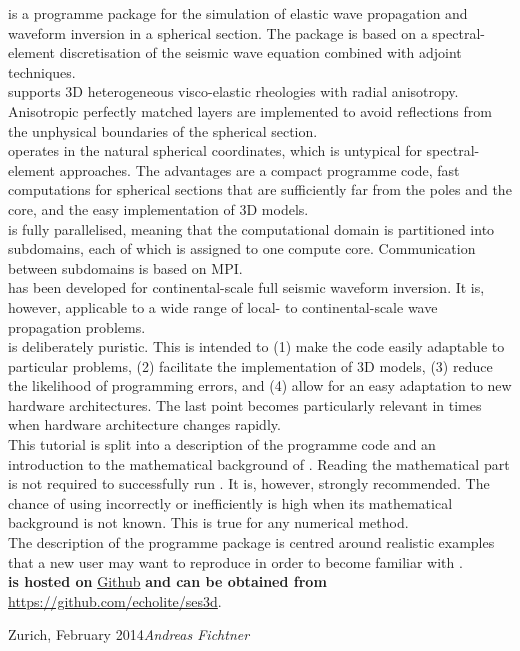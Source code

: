 \foreword

\SES is a programme package for the simulation of elastic wave
propagation and waveform inversion in a spherical section. The package is based on a spectral-element discretisation of
the seismic wave equation combined with adjoint techniques.\\[5pt]
\SES supports 3D heterogeneous visco-elastic rheologies with radial anisotropy. Anisotropic perfectly matched layers
are implemented to avoid reflections from the unphysical boundaries of the spherical section.\\[5pt]
\SES operates in the natural spherical coordinates, which is untypical for spectral-element approaches. The advantages are a
compact programme code, fast computations for spherical sections that are sufficiently far
from the poles and the core, and the easy implementation of 3D models.\\[5pt]
\SES is fully parallelised, meaning that the computational domain is partitioned into subdomains, each of which is assigned to one compute core. Communication between subdomains is based on MPI.\\[5pt]
\SES has been developed for continental-scale full seismic waveform
inversion. It is, however, applicable to a wide range of local- to continental-scale wave propagation problems.\\[5pt]
\SES is deliberately puristic. This is intended to (1) make the code
easily adaptable to particular problems, (2) facilitate the
implementation of 3D models, (3) reduce the likelihood of
programming errors, and (4) allow for an easy adaptation to new hardware architectures. The last point becomes particularly relevant in times when hardware architecture changes rapidly.\\[5pt]
This tutorial is split into a description of the programme code and
an introduction to the mathematical background of \SES. Reading the
mathematical part is not required to successfully run \SES. It is,
however, strongly recommended. The chance of using \SES incorrectly
or inefficiently is high when its mathematical background is not
known. This is true for any numerical method.\\[5pt]
The description of the programme package is centred around
realistic examples that a new user may want to reproduce in order to
become familiar with \SES.\\[5pt]
\textbf{\SES is hosted on} \href{https://github.com}{Github} \textbf{and can be obtained from} \href{https://github.com/echolite/ses3d}{https://github.com/echolite/ses3d}.


\vspace{\baselineskip}
\begin{flushright}\noindent
Zurich, February 2014\hfill {\it Andreas Fichtner}\\
\end{flushright}
